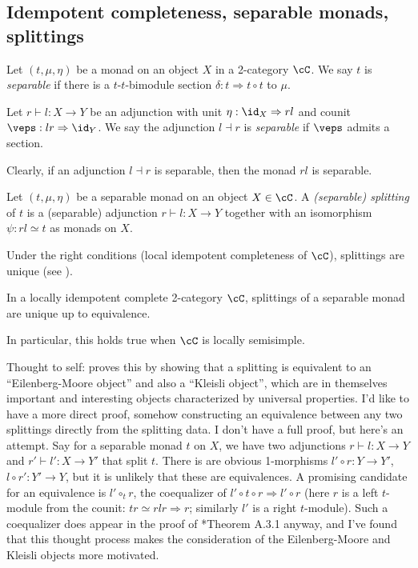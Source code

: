 \documentclass[12pt]{article}
\begin{document}
\subsection{Idempotent completeness, separable monads, splittings}

\begin{definition}
Let $(t, \mu, \eta)$ be a monad on an object $X$
in a 2-category $\cC$.
We say $t$ is \emph{separable} if there is a
$t$-$t$-bimodule section
$\delta: t \Rightarrow t \circ t$ to $\mu$.
\end{definition}

\begin{definition}
Let $r \vdash l: X \to Y$ be an adjunction
with unit $\eta: \id_X \Rightarrow rl$
and counit $\veps: lr \Rightarrow \id_Y$.
We say the adjunction $l \dashv r$ is \emph{separable}
if $\veps$ admits a section.
\end{definition}

Clearly, if an adjunction $l \dashv r$ is separable,
then the monad $rl$ is separable.

\begin{definition}
Let $(t,\mu,\eta)$ be a separable monad on
an object $X \in \cC$.
A \emph{(separable) splitting} of $t$ is a (separable) adjunction
$r \vdash l: X \to Y$
together with an isomorphism
$\psi: rl \simeq t$ as monads on $X$.
\end{definition}

Under the right conditions
(local idempotent completeness of $\cC$),
splittings are unique (see ).


\begin{proposition}
\label{p:splitting-unique}
In a locally idempotent complete 2-category $\cC$,
splittings of a separable monad are unique
up to equivalence.
\end{proposition}

In particular, this holds true when $\cC$
is locally semisimple.

Thought to self:
\cite{DRfusion} proves this by showing that
a splitting is equivalent
to an ``Eilenberg-Moore object'' and also a ``Kleisli object'',
which are in themselves important and interesting objects
characterized by universal properties.
I'd like to have a more direct proof,
somehow constructing an equivalence between any two splittings
directly from the splitting data.
I don't have a full proof, but here's an attempt.
Say for a separable monad $t$ on $X$,
we have two adjunctions $r \vdash l : X \to Y$
and $r' \vdash l' : X \to Y'$
that split $t$.
There is are obvious 1-morphisms $l' \circ r: Y \to Y'$,
$l \circ r': Y' \to Y$,
but it is unlikely that these are equivalences.
A promising candidate for an equivalence
is $l' \circ_t r$, the coequalizer of
$l' \circ t \circ r \Rightarrow l' \circ r$
(here $r$ is a left $t$-module from the counit:
$tr \simeq rlr \Rightarrow r$;
similarly $l'$ is a right $t$-module).
Such a coequalizer does appear in the proof of
\cite{DRfusion}*{Theorem A.3.1} anyway,
and I've found that this thought process
makes the consideration of the Eilenberg-Moore and Kleisli
objects more motivated.
\end{document}
